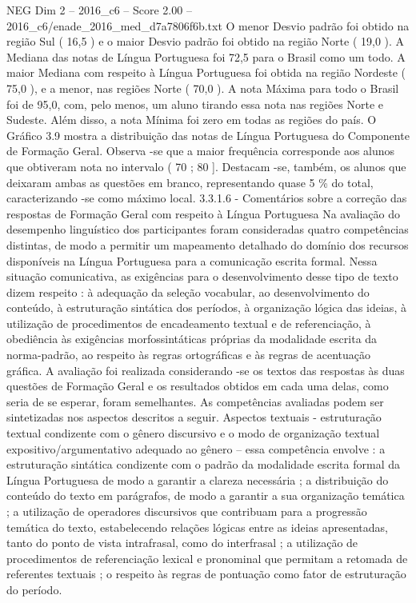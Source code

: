 \begin{textsample}{NEG Dim 2 – 2016\_c6 – Score 2.00 – 2016\_c6/enade\_2016\_med\_d7a7806f6b.txt}
O menor Desvio padrão foi obtido na região Sul ( 16,5 ) e o maior Desvio padrão foi obtido na região Norte ( 19,0 ).
A Mediana das notas de Língua Portuguesa foi 72,5 para o Brasil como um todo.
A maior Mediana com respeito à Língua Portuguesa foi obtida na região Nordeste ( 75,0 ), e a menor, nas regiões Norte ( 70,0 ).
A nota Máxima para todo o Brasil foi de 95,0, com, pelo menos, um aluno tirando essa nota nas regiões Norte e Sudeste.
Além disso, a nota Mínima foi zero em todas as regiões do país.
O Gráfico 3.9 mostra a distribuição das notas de Língua Portuguesa do Componente de Formação Geral.
Observa -se que a maior frequência corresponde aos alunos que obtiveram nota no intervalo ( 70 ; 80 ].
Destacam -se, também, os alunos que deixaram ambas as questões em branco, representando quase 5 \% do total, caracterizando -se como máximo local. 3.3.1.6 - Comentários sobre a correção das respostas de Formação Geral com respeito à Língua Portuguesa Na avaliação do desempenho linguístico dos participantes foram consideradas quatro competências distintas, de modo a permitir um mapeamento detalhado do domínio dos recursos disponíveis na Língua Portuguesa para a comunicação escrita formal.
Nessa situação comunicativa, as exigências para o desenvolvimento desse tipo de texto dizem respeito : à adequação da seleção vocabular, ao desenvolvimento do conteúdo, à estruturação sintática dos períodos, à organização lógica das ideias, à utilização de procedimentos de encadeamento textual e de referenciação, à obediência às exigências morfossintáticas próprias da modalidade escrita da norma-padrão, ao respeito às regras ortográficas e às regras de acentuação gráfica.
A avaliação foi realizada considerando -se os textos das respostas às duas questões de Formação Geral e os resultados obtidos em cada uma delas, como seria de se esperar, foram semelhantes.
As competências avaliadas podem ser sintetizadas nos aspectos descritos a seguir.
Aspectos textuais - estruturação textual condizente com o gênero discursivo e o modo de organização textual expositivo/argumentativo adequado ao gênero – essa competência envolve : a estruturação sintática condizente com o padrão da modalidade escrita formal da Língua Portuguesa de modo a garantir a clareza necessária ; a distribuição do conteúdo do texto em parágrafos, de modo a garantir a sua organização temática ; a utilização de operadores discursivos que contribuam para a progressão temática do texto, estabelecendo relações lógicas entre as ideias apresentadas, tanto do ponto de vista intrafrasal, como do interfrasal ; a utilização de procedimentos de referenciação lexical e pronominal que permitam a retomada de referentes textuais ; o respeito às regras de pontuação como fator de estruturação do período.

\end{textsample}

